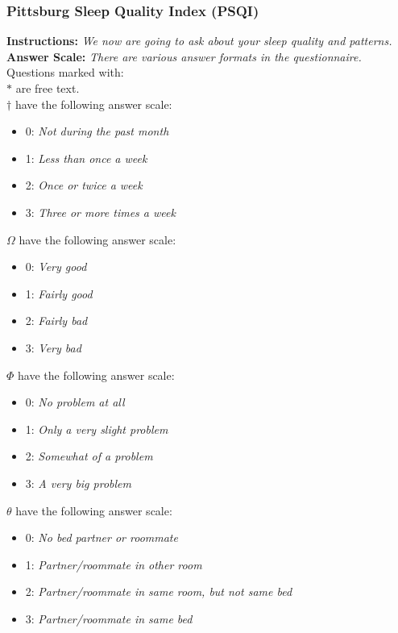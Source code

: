 \subsubsection{Pittsburg Sleep Quality Index (PSQI)}\label{sec:psqi}
\textbf{Instructions:} \emph{We now are going to ask about your sleep quality and patterns.}
\\
\textbf{Answer Scale:} \emph{There are various answer formats in the questionnaire.} Questions marked with:
\\
$\ast$ are free text.
\\
$\dagger$ have the following answer scale:
\begin{itemize}
    \item 0: \emph{Not during the past month}
    \item 1: \emph{Less than once a week}
    \item 2: \emph{Once or twice a week}
    \item 3: \emph{Three or more times a week}
\end{itemize}
$\Omega$ have the following answer scale:
\begin{itemize}
    \item 0: \emph{Very good}
    \item 1: \emph{Fairly good}
    \item 2: \emph{Fairly bad}
    \item 3: \emph{Very bad}
\end{itemize}
$\Phi$ have the following answer scale:
\begin{itemize}
    \item 0: \emph{No problem at all}
    \item 1: \emph{Only a very slight problem}
    \item 2: \emph{Somewhat of a problem}
    \item 3: \emph{A very big problem}
\end{itemize}
$\theta$ have the following answer scale:
\begin{itemize}
    \item 0: \emph{No bed partner or roommate}
    \item 1: \emph{Partner/roommate in other room}
    \item 2: \emph{Partner/roommate in same room, but not same bed}
    \item 3: \emph{Partner/roommate in same bed}
\end{itemize}
